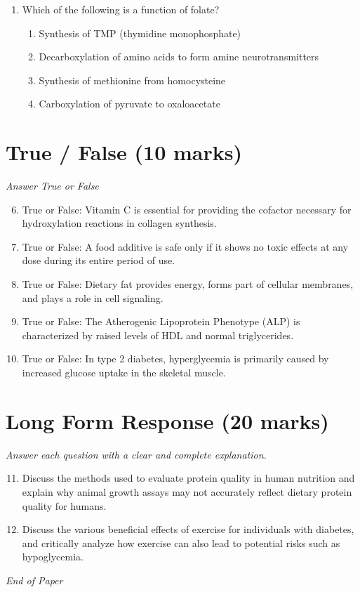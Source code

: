 \documentclass[12pt]{article}
\begin{document}
\begin{enumerate}[label=\arabic*.]
\begin{enumerate}[label=(\alph*)]
    \item Cholesterol mainly occurs in plant cell walls.
\end{enumerate}
\item Which of the following is a function of folate?
\begin{enumerate}[label=(\alph*)]
    \item Synthesis of TMP (thymidine monophosphate)
    \item Decarboxylation of amino acids to form amine neurotransmitters
    \item Synthesis of methionine from homocysteine
    \item Carboxylation of pyruvate to oxaloacetate
\end{enumerate}
\end{enumerate}

\section*{True / False (10 marks)}
\textit{Answer True or False}
\begin{enumerate}[label=\arabic*.]
\setcounter{enumi}{5}
\item True or False: Vitamin C is essential for providing the cofactor necessary for hydroxylation reactions in collagen synthesis.
\item True or False: A food additive is safe only if it shows no toxic effects at any dose during its entire period of use.
\item True or False: Dietary fat provides energy, forms part of cellular membranes, and plays a role in cell signaling.
\item True or False: The Atherogenic Lipoprotein Phenotype (ALP) is characterized by raised levels of HDL and normal triglycerides.
\item True or False: In type 2 diabetes, hyperglycemia is primarily caused by increased glucose uptake in the skeletal muscle.
\end{enumerate}

\section*{Long Form Response (20 marks)}
\textit{Answer each question with a clear and complete explanation.}
\begin{enumerate}[label=\arabic*.]
\setcounter{enumi}{10}
\item Discuss the methods used to evaluate protein quality in human nutrition and explain why
animal growth assays may not accurately reflect dietary protein quality for humans.
\item Discuss the various beneficial effects of exercise for individuals with diabetes, and
critically analyze how exercise can also lead to potential risks such as hypoglycemia.
\end{enumerate}

\vfill
\noindent\textit{End of Paper}
\end{document}
